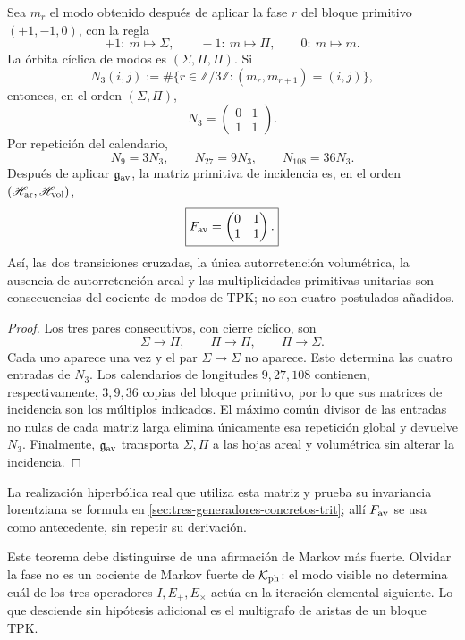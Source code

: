 \begin{theorem}
\label{thm:descenso-necesario-fav}
Sea \(m_r\) el modo obtenido después de aplicar la fase \(r\) del bloque
primitivo \((+1,-1,0)\), con la regla
\[
 +1:\ m\mapsto\Sigma,\qquad
 -1:\ m\mapsto\Pi,\qquad
 0:\ m\mapsto m.
\]
La órbita cíclica de modos es \((\Sigma,\Pi,\Pi)\). Si
\[
 N_3(i,j)
 :=
 \#\{r\in\mathbb Z/3\mathbb Z:(m_r,m_{r+1})=(i,j)\},
\]
entonces, en el orden \((\Sigma,\Pi)\),
\[
 \boxed{
 N_3=
 \begin{pmatrix}0&1\\1&1\end{pmatrix}.}
\]
Por repetición del calendario,
\[
 N_9=3N_3,\qquad N_{27}=9N_3,\qquad N_{108}=36N_3.
\]
Después de aplicar \(\mathfrak g_{\rm av}\), la matriz primitiva de
incidencia es, en el orden
\((\mathscr H_{\rm ar},\mathscr H_{\rm vol})\),
\[
 \boxed{
 F_{\rm av}=
 \begin{pmatrix}0&1\\1&1\end{pmatrix}.}
\]
Así, las dos transiciones cruzadas, la única autorretención volumétrica, la
ausencia de autorretención areal y las multiplicidades primitivas unitarias
son consecuencias del cociente de modos de TPK; no son cuatro postulados
añadidos.
\end{theorem}

\begin{proof}
Los tres pares consecutivos, con cierre cíclico, son
\[
 \Sigma\longrightarrow\Pi,\qquad
 \Pi\longrightarrow\Pi,\qquad
 \Pi\longrightarrow\Sigma.
\]
Cada uno aparece una vez y el par
\(\Sigma\to\Sigma\) no aparece. Esto determina las cuatro entradas de
\(N_3\). Los calendarios de longitudes \(9,27,108\) contienen,
respectivamente, \(3,9,36\) copias del bloque primitivo, por lo que sus
matrices de incidencia son los múltiplos indicados. El máximo común divisor
de las entradas no nulas de cada matriz larga elimina únicamente esa
repetición global y devuelve \(N_3\). Finalmente,
\(\mathfrak g_{\rm av}\) transporta \(\Sigma,\Pi\) a las hojas areal y
volumétrica sin alterar la incidencia.
\end{proof}

La realización hiperbólica real que utiliza esta matriz y prueba su
invariancia lorentziana se formula en
\cref{sec:tres-generadores-concretos-trit}; allí \(F_{\rm av}\) se usa
como antecedente, sin repetir su derivación.

Este teorema debe distinguirse de una afirmación de Markov más fuerte.
Olvidar la fase no es un cociente de Markov fuerte de
\(\mathcal K_{\rm ph}\): el modo visible no determina cuál de los tres
operadores \(I,E_+,E_\times\) actúa en la iteración elemental siguiente. Lo que desciende
sin hipótesis adicional es el multigrafo de aristas de un bloque TPK\@.

